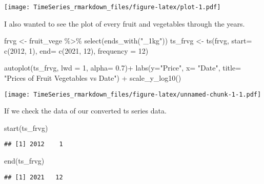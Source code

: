 \documentclass[
]{article}
\newenvironment{Shaded}{\begin{snugshade}}{\end{snugshade}}
\newcommand{\AttributeTok}[1]{\textcolor[rgb]{0.77,0.63,0.00}{#1}}
\newcommand{\DecValTok}[1]{\textcolor[rgb]{0.00,0.00,0.81}{#1}}
\newcommand{\FloatTok}[1]{\textcolor[rgb]{0.00,0.00,0.81}{#1}}
\newcommand{\FunctionTok}[1]{\textcolor[rgb]{0.00,0.00,0.00}{#1}}
\newcommand{\NormalTok}[1]{#1}
\newcommand{\OtherTok}[1]{\textcolor[rgb]{0.56,0.35,0.01}{#1}}
\newcommand{\SpecialCharTok}[1]{\textcolor[rgb]{0.00,0.00,0.00}{#1}}
\newcommand{\StringTok}[1]{\textcolor[rgb]{0.31,0.60,0.02}{#1}}
\begin{document}
\texttt{[image: TimeSeries\_rmarkdown\_files/figure-latex/plot-1.pdf]}

I also wanted to see the plot of every fruit and vegetables through the
years.

\begin{Shaded}
\begin{Highlighting}[]
\NormalTok{frvg }\OtherTok{\textless{}{-}}\NormalTok{ fruit\_vege }\SpecialCharTok{\%\textgreater{}\%} \FunctionTok{select}\NormalTok{(}\FunctionTok{ends\_with}\NormalTok{(}\StringTok{"\_1kg"}\NormalTok{))}
\NormalTok{ts\_frvg }\OtherTok{\textless{}{-}} \FunctionTok{ts}\NormalTok{(frvg, }\AttributeTok{start=} \FunctionTok{c}\NormalTok{(}\DecValTok{2012}\NormalTok{, }\DecValTok{1}\NormalTok{), }\AttributeTok{end=} \FunctionTok{c}\NormalTok{(}\DecValTok{2021}\NormalTok{, }\DecValTok{12}\NormalTok{), }\AttributeTok{frequency =} \DecValTok{12}\NormalTok{)}

\FunctionTok{autoplot}\NormalTok{(ts\_frvg, }\AttributeTok{lwd =} \DecValTok{1}\NormalTok{, }\AttributeTok{alpha=} \FloatTok{0.7}\NormalTok{)}\SpecialCharTok{+}
  \FunctionTok{labs}\NormalTok{(}\AttributeTok{y=}\StringTok{"Price"}\NormalTok{, }\AttributeTok{x=} \StringTok{"Date"}\NormalTok{, }\AttributeTok{title=} \StringTok{"Prices of Fruit Vegetables vs Date"}\NormalTok{) }\SpecialCharTok{+} 
  \FunctionTok{scale\_y\_log10}\NormalTok{()}
\end{Highlighting}
\end{Shaded}

\texttt{[image: TimeSeries\_rmarkdown\_files/figure-latex/unnamed-chunk-1-1.pdf]}

If we check the data of our converted ts series data.

\begin{Shaded}
\begin{Highlighting}[]
\FunctionTok{start}\NormalTok{(ts\_frvg)}
\end{Highlighting}
\end{Shaded}

\begin{verbatim}
## [1] 2012    1
\end{verbatim}

\begin{Shaded}
\begin{Highlighting}[]
\FunctionTok{end}\NormalTok{(ts\_frvg)}
\end{Highlighting}
\end{Shaded}

\begin{verbatim}
## [1] 2021   12
\end{verbatim}
\end{document}
